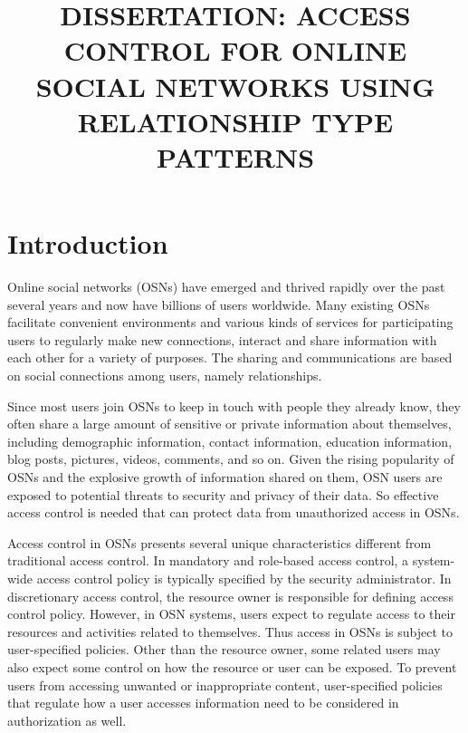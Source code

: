 \documentclass[10pt, conference, compsocconf]{IEEEtran}
\begin{document}
\title{DISSERTATION: ACCESS CONTROL FOR ONLINE SOCIAL NETWORKS
USING RELATIONSHIP TYPE PATTERNS}

\author{


}

\maketitle
\thispagestyle{plain}
\pagestyle{plain}


\section{Introduction}
Online social networks (OSNs) have emerged and thrived rapidly over the past several years and now have billions of users worldwide. Many existing OSNs facilitate convenient environments and various kinds of services for participating users to regularly make new connections, interact and share information with each other for a variety of purposes. The sharing and communications are based on social connections among users, namely relationships.

Since most users join OSNs to keep in touch with people they already know, they often share a large amount of sensitive or private information about themselves, including demographic information, contact information, education information, blog posts, pictures, videos, comments, and so on. Given the rising popularity of OSNs and the explosive growth of information shared on them, OSN users are exposed to potential threats to security and privacy of their data. So effective access control is needed that can protect data from unauthorized access in OSNs.

Access control in OSNs presents several unique characteristics different from traditional access
control. In mandatory and role-based access control, a system-wide access control policy is typically specified by the security administrator. In discretionary access control, the resource owner
is responsible for defining access control policy. However, in OSN systems, users expect to regulate access to their resources and activities related to themselves. Thus access in OSNs is subject
to user-specified policies. Other than the resource owner, some related users may also expect some control on how the resource or user can be exposed. To prevent users from accessing unwanted or inappropriate content, user-specified policies that regulate how a user accesses information need to be considered in
authorization as well.
\end{document}
